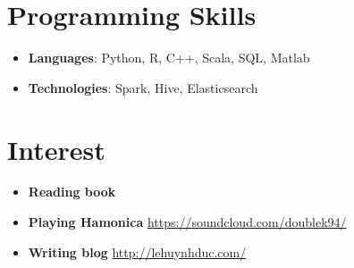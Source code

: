 \documentclass[letterpaper,11pt]{article}
\newcommand{\resumeSubHeadingListStart}{\begin{itemize}[leftmargin=*]}
\newcommand{\resumeSubHeadingListEnd}{\end{itemize}}
\begin{document}
%
\section{Programming Skills}
  \resumeSubHeadingListStart
    \item{
      \textbf{Languages}{: Python, R, C++, Scala, SQL, Matlab}
    }
  	\item{
	  \textbf{Technologies}{: Spark, Hive, Elasticsearch}
  	}
  \resumeSubHeadingListEnd

\section{Interest}
  \resumeSubHeadingListStart
  	\item{
  	  \textbf{Reading book}
  	}
  	\item{
	  \textbf{Playing Hamonica}
	  \href{https://soundcloud.com/doublek94/}{https://soundcloud.com/doublek94/}	
  	}
	\item{
	  \textbf{Writing blog}
	  \href{http://lehuynhduc.com/}{http://lehuynhduc.com/}
	}
  \resumeSubHeadingListEnd

\end{document}
